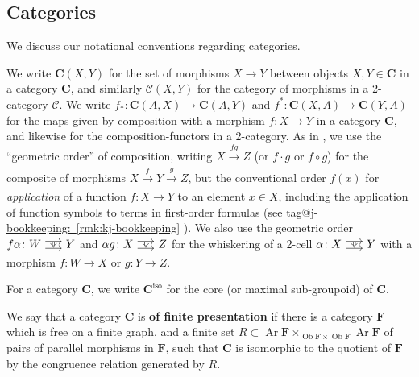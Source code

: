 \documentclass{amsart}
\makeatletter
\newcommand\Ar{\operatorname{Ar}}
\newcommand\bC{\mathbf{C}}
\newcommand\bF{\mathbf{F}}
\newcommand\cC{\mathcal{C}}
\newcommand\defword[1]{{\boldmath \textbf{#1}}}
\newcommand\iso{\mathrm{iso}}
\newcommand\Ob{\operatorname{Ob}}
\newcommand\tocell{\hspace{-5pt}\begin{tikzcd}[column sep=15pt, ampersand replacement=\&]{}\ar[r, shift left=3pt, ""{name=top}]\ar[r, shift right=3pt, ""'{name=bot}, start anchor=east, end anchor=west]\&{}\ar[Rightarrow, from=top, to=bot, shorten=0.5pt]\end{tikzcd}\hspace{-5pt}}
\newcommand\tox[2][]{\xrightarrow[#1]{#2}}
\newcommand\tagword[1]{\csname tag@#1\endcsname}
\def\label@tag#1:#2\@nil{#1}
\newcommand\labeltag[1]{\label@tag#1:\@nil}
\newcommand\jref[1]{%
  \texorpdfstring%
    {\hyperref[#1]{\tagword{\labeltag{#1}}~\ref*{#1}}}%
    {\tagword{\labeltag{#1}}~\ref*{#1}}%
}
\theoremstyle{definition}
\theoremstyle{remark}
\theoremstyle{plainwithref}
\makeatother
\begin{document}
\subsection{Categories} \label{subsec:cat-prelims}
We discuss our notational conventions regarding categories.

We write \( \bC(X, Y) \) for the set of morphisms \( X \to Y \) between objects \( X,Y \in \bC \) in a category \( \bC \), and similarly \( \cC(X,Y) \) for the category of morphisms in a 2-category \( \cC \).
We write \( f_* \colon \bC(A, X) \to \bC(A, Y) \) and \( f^* \colon \bC(X, A) \to \bC(Y, A) \) for the maps given by composition with a morphism \( f \colon X \to Y \) in a category \( \bC \), and likewise for the composition-functors in a 2-category.
As in \cite{helfer-topoi-in-topoi}, we use the ``geometric order'' of composition, writing \( X \tox{f g} Z \) (or \( f \cdot g \) or \( f \circ g \)) for the composite of morphisms \( X \tox{f} Y \tox{g} Z \), but the conventional order \( f(x) \) for \emph{application} of a function \( f \colon X \to Y \) to an element \( x \in X \), including the application of function symbols to terms in first-order formulas (see \jref{rmk:kj-bookkeeping}).
We also use the geometric order \( f \alpha \colon W \tocell Y \) and \( \alpha g \colon X \tocell Z \) for the whiskering of a 2-cell \( \alpha \colon X \tocell Y \) with a morphism \( f \colon W \to X \) or \( g \colon Y \to Z \).

For a category \( \bC \), we write \( \bC^\iso \) for the core (or maximal sub-groupoid) of \( \bC \).

We say that a category \( \bC \) is \defword{of finite presentation} if there is a category \( \bF \) which is free on a finite graph, and a finite set \( R \subset \Ar \bF \times_{\Ob \bF \times \Ob \bF} \Ar \bF \) of pairs of parallel morphisms in \( \bF \), such that \( \bC \) is isomorphic to the quotient of \( \bF \) by the congruence relation generated by \( R \).
\end{document}
